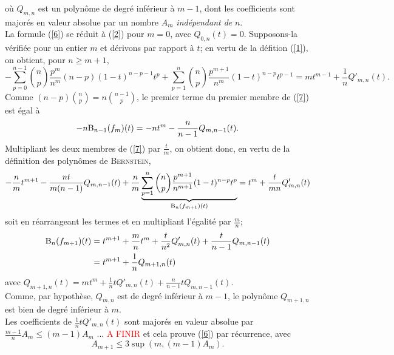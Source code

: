 \begin{preuve}
\begin{equation}
    \end{equation}
    où $Q_{m,n}$ est un polynôme de degré inférieur à $m-1$, dont les coefficients sont majorés en valeur absolue par un nombre $A_m$ \emph{indépendant de} $n$. \\
    La formule (\ref{6}) se réduit à (\ref{2}) pour $m=0$, avec $Q_{0,n}(t) = 0$. Supposons-la vérifiée pour un entier $m$ et dérivons par rapport à $t$; en vertu de la défition (\ref{1}), on obtient, pour $n \geqslant m+1$, 
    \begin{equation} \label{7}
        -\sum_{p=0}^{n-1} \binom{n}{p} \frac{p^m}{n^m}(n-p)(1-t)^{n-p-1}t^p + \sum_{p=1}^n \binom{n}{p} \frac{p^{m+1}}{n^m}(1-t)^{n-p}t^{p-1} = mt^{m-1} + \frac{1}{n} Q'_{m,n}(t).
    \end{equation}
    Comme $(n-p) \binom{n}{p} = n \binom{n-1}{p}$, le premier terme du premier membre de (\ref{7}) est égal à 
    $$-n \mathrm{B}_{n-1}(f_m)(t) = -nt^m - \frac{n}{n-1}Q_{m, n-1}(t).$$ 
    Multipliant les deux membres de (\ref{7}) par $\frac{t}{m}$, on obtient donc, en vertu de la définition des polynômes de \textsc{Bernstein},
    \begin{equation*}
        -\frac{n}{m} t^{m+1} - \frac{nt}{m(n-1)}Q_{m, n-1}(t) + \frac{n}{m} \underbrace{\sum_{p=1}^n \binom{n}{p} \frac{p^{m+1}}{n^{m+1}}(1-t)^{n-p}t^p}_{\mathrm{B}_n(f_{m+1})(t)} = t^m + \frac{t}{mn}Q'_{m,n}(t)\\
    \end{equation*}
    soit en réarrangeant les termes et en multipliant l'égalité par $\frac{m}{n}$;
    \begin{align*}
        \mathrm{B}_n(f_{m+1})(t) &= t^{m+1} + \frac{m}{n}t^m + \frac{t}{n^2}Q'_{m,n}(t) + \frac{t}{n-1} Q_{m, n-1}(t) \\
        &= t^{m+1} + \frac{1}{n}Q_{m+1, n}(t)
    \end{align*}
    avec $Q_{m+1, n}(t) = mt^m + \frac{1}{n}t Q'_{m,n}(t) + \frac{n}{n-1}t Q_{m,n-1}(t)$. \\
    Comme, par hypothèse, $Q_{m,n}$ est de degré inférieur à $m-1$, le polynôme $Q_{m+1, n}$ est bien de degré inférieur à $m$. \\
    Les coefficients de $\frac{1}{n}t Q'_{m,n}(t)$ sont majorés en valeur absolue par $\frac{m-1}{n}A_m \leqslant (m-1)A_m$ ... \textcolor{red}{A FINIR}
    et cela prouve (\ref{6}) par récurrence, avec
    $$A_{m+1} \leqslant 3 \sup(m, (m-1) A_m).$$
\end{preuve}


